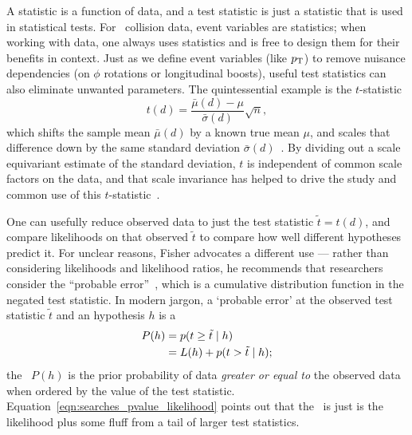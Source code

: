 A statistic is a function of data, and a test statistic is just a statistic
that is used in statistical tests.
For \atlas\ collision data, event variables are statistics; when working with
data, one always uses statistics and is free to design them for their benefits
in context.
Just as we define event variables (like $p_\mathrm{T}$) to remove nuisance
dependencies (on $\phi$ rotations or longitudinal boosts),
useful test statistics can also eliminate unwanted parameters.
The quintessential example is the $t$-statistic
\begin{equation}
\label{eqn:searches_t_statistic}
t(d) = \frac{\bar{\mu}(d) - \mu}{\bar{\sigma}(d)}\sqrt{n}
,
\end{equation}
which shifts the sample mean $\bar{\mu}(d)$ by a known true mean $\mu$, and
scales that difference down by the same standard deviation
$\bar{\sigma}(d)$~\cite{student1908, fisher1925t}.
By dividing out a scale equivariant estimate of the standard deviation, $t$ is
independent of common scale factors on the data, and that scale invariance
has helped to drive the study and common use of this
$t$-statistic~\cite{lehmann2011fisher}.

One can usefully reduce observed data to just the test statistic
$\tilde{t} = t(d)$, and compare likelihoods on that observed $\tilde{t}$
to compare how well different hypotheses predict it.
For unclear reasons, Fisher advocates a different use ---
rather than considering likelihoods and likelihood ratios, he recommends
that researchers consider the ``probable error''~\cite{fisher1921probable},
which is a cumulative distribution function in the negated test statistic.
In modern jargon, a `probable error' at the observed test statistic
$\tilde{t}$ and an hypothesis $h$ is a \textbf{\pvalue}
\begin{align}
P(h)
&= p(t \geq \tilde{t} \mid h)
\label{eqn:searches_pvalue}
\\
&= L(h) + p(t > \tilde{t} \mid h)
\label{eqn:searches_pvalue_likelihood}
;
\end{align}
the \pvalue\ $P(h)$ is the prior probability of data
\emph{greater or equal to} the observed data when ordered by the value of the
test statistic.
Equation~\ref{eqn:searches_pvalue_likelihood} points out that the \pvalue\ is
just is the likelihood plus some fluff from a tail of larger test statistics.

